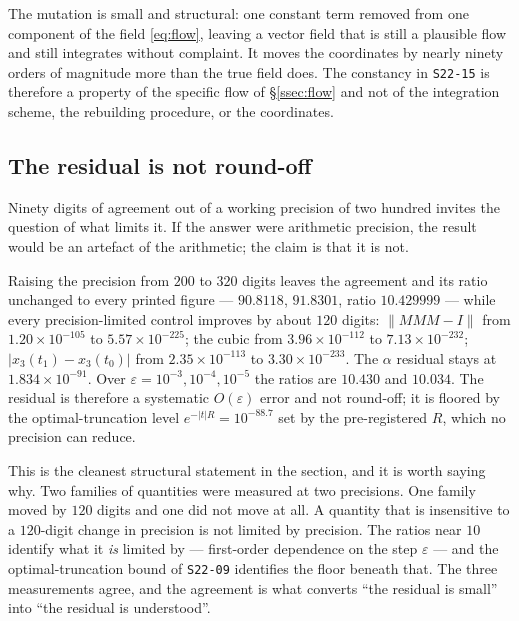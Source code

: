 The mutation is small and structural: one constant term removed from one
component of the field \eqref{eq:flow}, leaving a vector field that is still a
plausible flow and still integrates without complaint. It moves the
coordinates by nearly ninety orders of magnitude more than the true field does.
The constancy in \texttt{S22-15} is therefore a property of the specific flow
of \S\ref{ssec:flow} and not of the integration scheme, the rebuilding
procedure, or the coordinates.

\subsection{The residual is not round-off}\label{ssec:notroundoff}

Ninety digits of agreement out of a working precision of two hundred invites
the question of what limits it. If the answer were arithmetic precision, the
result would be an artefact of the arithmetic; the claim is that it is not.

\begin{remark}
Raising the precision from $200$ to $320$ digits leaves the agreement and its
ratio unchanged to every printed figure --- $90.8118$, $91.8301$, ratio
$10.429999$ --- while every precision-limited control improves by about $120$
digits: $\|MMM-I\|$ from $1.20\times10^{-105}$ to $5.57\times10^{-225}$; the
cubic from $3.96\times10^{-112}$ to $7.13\times10^{-232}$; $|x_3(t_1)-x_3(t_0)|$
from $2.35\times10^{-113}$ to $3.30\times10^{-233}$. The $\alpha$ residual stays
at $1.834\times10^{-91}$. Over $\varepsilon=10^{-3},10^{-4},10^{-5}$ the ratios
are $10.430$ and $10.034$. The residual is therefore a systematic $O(\varepsilon)$
error and not round-off; it is floored by the optimal-truncation level
$e^{-|t|R}=10^{-88.7}$ set by the pre-registered $R$, which no precision can
reduce.
\end{remark}

This is the cleanest structural statement in the section, and it is worth
saying why. Two families of quantities were measured at two precisions. One
family moved by $120$ digits and one did not move at all. A quantity that is
insensitive to a $120$-digit change in precision is not limited by precision.
The ratios near $10$ identify what it \emph{is} limited by --- first-order
dependence on the step $\varepsilon$ --- and the optimal-truncation bound of
\texttt{S22-09} identifies the floor beneath that. The three measurements
agree, and the agreement is what converts ``the residual is small'' into ``the
residual is understood''.

